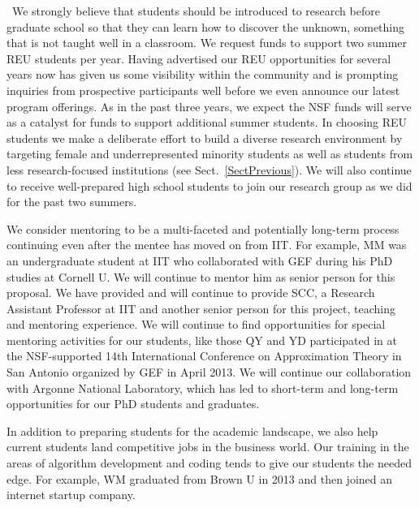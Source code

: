\documentclass[11pt]{NSFamsart}
\begin{document}
\begin{description}[leftmargin=0ex]
\item[Providing Research Experiences for Undergraduates and High School Students]\ We \linebreak[4]    strongly believe that students should be introduced to research before graduate school so that they can learn how to discover the unknown, something that is not taught well in a classroom. We request funds to support two summer REU students per year. Having advertised our REU opportunities for several years now has given us some visibility within the community and is prompting inquiries from prospective participants well before we even announce our latest program offerings. As in the past three years, we expect the NSF funds will serve as a catalyst for funds to support additional summer students. In choosing REU students we make a deliberate effort to build a diverse research environment by targeting female and underrepresented minority students as well as students from less research-focused institutions (see Sect.~\ref{SectPrevious}). We will also continue to receive well-prepared high school students to join our research group as we did for the past two summers.

\item[Preparing Students for Academic Careers] We consider mentoring to be a multi-faceted and potentially long-term process continuing even after the mentee has moved on from IIT.  For example, MM was an undergraduate student at IIT who collaborated with GEF during his PhD studies at Cornell U.  We will continue to mentor him as senior person for this proposal.
    We have provided and will continue to provide SCC, a Research Assistant Professor at IIT and another senior person for this project, teaching and mentoring experience.  We will continue to find opportunities for special mentoring activities for our students, like those QY and YD participated in at the NSF-supported 14th International Conference on Approximation Theory in San Antonio organized by GEF in April 2013.  We  will continue our collaboration with Argonne National Laboratory, which has led to short-term and long-term opportunities for our PhD students and graduates.

\item[Preparing Students for Industry Careers]
In addition to preparing students for the academic landscape, we also help current students land competitive jobs in the business world. Our training in the areas of algorithm development and coding tends to give our students the needed edge. For example, WM graduated from Brown U in 2013 and then joined an internet startup company.


\end{description}
\end{document}
